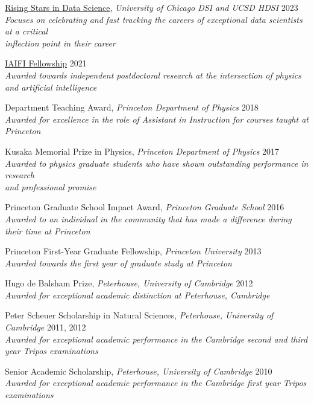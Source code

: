 \documentclass[letterpaper,11pt]{article}
\newenvironment{packed_itemize}{
\begin{itemize}[label=\raisebox{0.25ex}{\tiny$\bullet$}]
  \setlength{\itemsep}{4.0pt}
  \setlength{\parskip}{0pt}
  \setlength{\parsep}{0pt}}{\end{itemize}
}
\begin{document}
\begin{packed_itemize}
  \item \href{https://datascience.uchicago.edu/research/postdoctoral-programs/rising-stars-in-data-science-2/2023-rising-stars/}{Rising Stars in Data Science}, \emph{University of Chicago DSI and UCSD HDSI} \hfill 2023 \\ \emph{\small Focuses on celebrating and fast tracking the careers of exceptional data scientists at a critical \\ inflection point in their career}
  \item \href{https://iaifi.org/current-fellows.html}{IAIFI Fellowship} \hfill 2021 \\ \emph{\small Awarded towards independent postdoctoral research at the intersection of physics and artificial intelligence}
  \item Department Teaching Award, \emph{Princeton Department of Physics}  \hfill 2018 \\ \emph{\small Awarded for excellence in the role of Assistant in Instruction for courses taught at Princeton}
  \item Kusaka Memorial Prize in Physics, \emph{Princeton Department of Physics} \hfill 2017 \\ \emph{\small Awarded to physics graduate students who have shown outstanding performance in research \\ and professional promise}
  \item Princeton Graduate School Impact Award, \emph{Princeton Graduate School} \hfill 2016 \\ \emph{\small Awarded to an individual in the community that has made a difference during their time at Princeton}
  \item Princeton First-Year Graduate Fellowship, \emph{Princeton University} \hfill 2013 \\ \emph{\small Awarded towards the first year of graduate study at Princeton}
  \item Hugo de Balsham Prize, \emph{Peterhouse, University of Cambridge}  \hfill 2012 \\ \emph{\small Awarded for exceptional academic distinction at Peterhouse, Cambridge}
  \item Peter Scheuer Scholarship in Natural Sciences, \emph{Peterhouse, University of Cambridge} \hfill 2011, 2012 \\ \emph{\small Awarded for exceptional academic performance in the Cambridge second and third year Tripos examinations}
  \item Senior Academic Scholarship, \emph{Peterhouse, University of Cambridge} \hfill 2010\\ \emph{\small Awarded for exceptional academic performance in the Cambridge first year Tripos examinations}
\end{packed_itemize}
\end{document}

